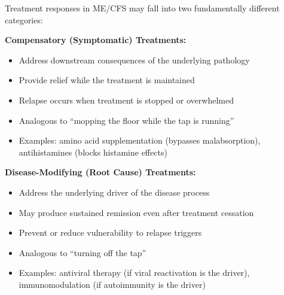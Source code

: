 \begin{observation}
\label{obs:compensatory-dm}
Treatment responses in ME/CFS may fall into two fundamentally different categories:

\textbf{Compensatory (Symptomatic) Treatments:}
\begin{itemize}
    \item Address downstream consequences of the underlying pathology
    \item Provide relief while the treatment is maintained
    \item Relapse occurs when treatment is stopped or overwhelmed
    \item Analogous to ``mopping the floor while the tap is running''
    \item Examples: amino acid supplementation (bypasses malabsorption), antihistamines (blocks histamine effects)
\end{itemize}

\textbf{Disease-Modifying (Root Cause) Treatments:}
\begin{itemize}
    \item Address the underlying driver of the disease process
    \item May produce sustained remission even after treatment cessation
    \item Prevent or reduce vulnerability to relapse triggers
    \item Analogous to ``turning off the tap''
    \item Examples: antiviral therapy (if viral reactivation is the driver), immunomodulation (if autoimmunity is the driver)
\end{itemize}
\end{observation}

